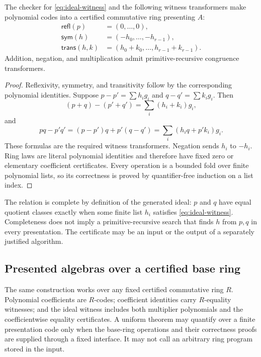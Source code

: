 \begin{theorem}\label{thm:quotient-setoid}
The checker for \eqref{eq:ideal-witness} and the following witness transformers make polynomial
codes into a certified commutative ring presenting $A$:
\begin{align*}
\mathsf{refl}(p)&=(0,\ldots,0),\\
\mathsf{sym}(h)&=(-h_0,\ldots,-h_{r-1}),\\
\mathsf{trans}(h,k)&=(h_0+k_0,\ldots,h_{r-1}+k_{r-1}).
\end{align*}
Addition, negation, and multiplication admit primitive-recursive congruence transformers.
\end{theorem}

\begin{proof}
Reflexivity, symmetry, and transitivity follow by the corresponding polynomial identities.  Suppose
$p-p'=\sum h_i g_i$ and $q-q'=\sum k_i g_i$.  Then
\[
 (p+q)-(p'+q')=\sum_i(h_i+k_i)g_i,
\]
and
\[
 pq-p'q'=(p-p')q+p'(q-q')
         =\sum_i(h_iq+p'k_i)g_i.
\]
These formulas are the required witness transformers.  Negation sends $h_i$ to $-h_i$.  Ring laws
are literal polynomial identities and therefore have fixed zero or elementary coefficient
certificates.  Every operation is a bounded fold over finite polynomial lists, so its correctness is
proved by quantifier-free induction on a list index.
\end{proof}

The relation is complete by definition of the generated ideal: $p$ and $q$ have equal quotient
classes exactly when some finite list $h_i$ satisfies \eqref{eq:ideal-witness}.  Completeness does not
imply a primitive-recursive search that finds $h$ from $p,q$ in every presentation.  The certificate
may be an input or the output of a separately justified algorithm.

\subsection{Presented algebras over a certified base ring}

The same construction works over any fixed certified commutative ring $R$.  Polynomial coefficients
are $R$-codes; coefficient identities carry $R$-equality witnesses; and the ideal witness includes
both multiplier polynomials and the coefficientwise equality certificates.  A uniform theorem may
quantify over a finite presentation code only when the base-ring operations and their correctness
proofs are supplied through a fixed interface.  It may not call an arbitrary ring program stored in
the input.

